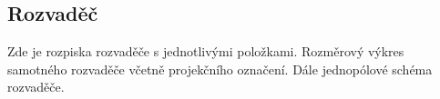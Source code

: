 \begin{Czech}
\section{Rozvaděč}
\end{Czech}

\begin{Czech}
Zde je rozpiska rozvaděče s jednotlivými položkami. Rozměrový výkres samotného rozvaděče včetně projekčního označení. Dále jednopólové schéma rozvaděče.
\end{Czech}

\begin{Czech}





\end{Czech}